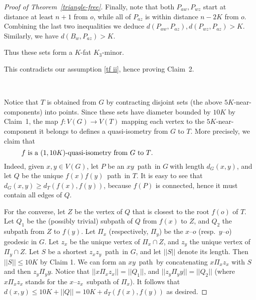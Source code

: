 \documentclass[a4paper]{article}
\newcommand{\comment}[1]{}
\newcommand{\defi}[1]{{\color{darkgray}\emph{#1}}}
\newcommand{\sm}{\backslash}
\newcommand{\pth}[2]{\ensuremath{#1}\text{--}\ensuremath{#2}~path}
\newcommand{\g}{\ensuremath{G\ }}
\newcommand{\G}{\ensuremath{G}}
\newcommand{\Tr}[1]{Theorem~\ref{#1}}
\newcommand{\st}{such that}
\newcommand{\labtequ}[2]{\begin{equation} \label{#1} 	\begin{minipage}[c]{0.9\textwidth}  #2 \end{minipage} \ignorespacesafterend \end{equation} }
\begin{document}
\begin{proof}[Proof of \Tr{triangle-free}]
Finally, note that both $P_{aw},P_{wz}$ start at distance at least $n+1$ from $o$, while all of $P_{az}$ is within distance $n-2K$ from $o$. Combining the last two inequalities we deduce $d(P_{aw}, P_{az}), d(P_{wz}, P_{az})> K$. Similarly, we have $d(B_w, P_{az})> K$. 

Thus these sets form a   $K$-fat $K_3$-minor. 
\comment{Old wrong version: Pick a point $p$ on $A$ \st\ 
\labtequ{apz}{$d(a,p) = d(p,z)= \frac{d(a,z)}{2}>2K$.}
Let $Z$ be a \pth{a}{z} contained in their union $\pi_{a o} \cup \pi_{z o}$. By choosing three appropriate branch sets around $a, p$ and $z$ we can find a $K$-fat $K_3$-minor in $A \cup Z$ as follows. Let $B_a$ be the initial subpath of $\pi_{a o}$ of length $K$ and let $B_z$ be the initial subpath of $\pi_{z o}$ of length $K$. Let $a'$ be the last vertex of $A$, as we move from $a$ towards $z$, with $d(B_a,a')= K$ ---which exists by \eqref{apz}--- and similarly, let $z'$ be the first vertex of $A$ with $d(B_z,z')= K$. Then let $B_p$ be the subpath of $A$ from $a'$ to $z'$, and note that, by the choice of $a',z'$, we have 
\labtequ{Bp}{$d(B_p,B_a), d(B_p,B_z)\geq K$.}
Finally, let $P_{ap}$ and $P_{pz}$ be the two subpaths of $A \sm B_p$, and let $P_{az}= Z \sm \{B_a \cup B_z\}$. It is straightforward to check that these sets form a   $K$-fat $K_3$-minor using \eqref{az}, \eqref{Bp}, and the fact that $P_{az}$ is within distance $n-K$ from $o$ while $d(A,o)=n$ by the definitions.} 
This contradicts our assumption \ref{tf ii}, hence proving Claim~2.

\

Notice that  $T$ is obtained from $G$ by contracting disjoint sets (the above $5K$-near-components) into points. Since these sets have diameter bounded by $10K$ by Claim~1, the map $f: V(G) \to V(T)$ mapping each vertex to the $5K$-near-component it belongs to defines a quasi-isometry from $G$ to $T$. More precisely, we claim that 
\labtequ{fourteen}{$f$ is a $(1,10K)$-quasi-isometry from $G$ to $T$.}
Indeed, given $x,y\in V(G)$, let $P$ be an \pth{x}{y}\ in \g with length $d_G(x,y)$, and let $Q$ be the unique \pth{f(x)}{f(y)}\ in $T$. It is easy to see that $d_G(x,y)\geq d_T(f(x),f(y))$, because $f(P)$ is connected, hence it must contain all edges of $Q$. 

For the converse, let $Z$ be the vertex of $Q$ that is closest to the root $f(o)$ of $T$. Let $Q_1$ be the (possibly trivial) subpath of $Q$  from $f(x)$ to $Z$, and $Q_2$ the subpath  from $Z$  to $f(y)$. Let $\Pi_x$ (respectively,  $\Pi_y$) be the $x$--$o$ (resp.\ $y$--$o$) geodesic in \G. Let $z_x$ be the unique vertex of $\Pi_x \cap Z$, and $z_y$ the unique vertex of $\Pi_y \cap Z$. Let $S$ be a shortest \pth{z_x}{z_y}\ in \G, and let \defi{$||S||$} denote its length. Then $||S||\leq 10K$ by Claim 1. We can form an  \pth{x}{y}\ by concatenating $x \Pi_x z_x$ with $S$ and then $z_y \Pi_y y$. Notice that $||x \Pi_x z_x|| = ||Q_1|| $, and $||z_y \Pi_y y|| = ||Q_2||$ (where $x \Pi_x z_x$ stands for the $x$--$z_x$~subpath of $\Pi_x$). It follows that\\  
 $d(x,y)\leq 10K + ||Q|| = 10K + d_T(f(x),f(y))$ as desired.
\medskip


\end{proof}
\end{document}

